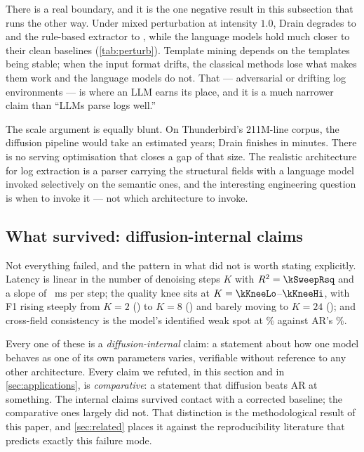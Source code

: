 There is a real boundary, and it is the one negative result in this subsection
that runs the other way. Under mixed perturbation at intensity $1.0$, Drain
degrades to \drainPerturbed{} and the rule-based extractor to ,
while the language models hold much closer to their clean baselines
(\cref{tab:perturb}). Template mining depends on the templates being stable;
when the input format drifts, the classical methods lose what makes them work
and the language models do not. That --- adversarial or drifting log
environments --- is where an LLM earns its place, and it is a much narrower
claim than ``LLMs parse logs well.''

The scale argument is equally blunt. On Thunderbird's 211M-line corpus, the
diffusion pipeline would take an estimated \thunderbirdDM{} years; Drain
finishes in \thunderbirdDrain{} minutes. There is no serving optimisation that
closes a gap of that size. The realistic architecture for log extraction is a
parser carrying the structural fields with a language model invoked selectively
on the semantic ones, and the interesting engineering question is when to
invoke it --- not which architecture to invoke.

\subsection{What survived: diffusion-internal claims}
\label{sec:neg-survived}

Not everything failed, and the pattern in what did not is worth stating
explicitly. Latency is linear in the number of denoising steps $K$ with
$R^2 = \kSweepRsq$ and a slope of \kSweepSlope~ms per step; the quality knee
sits at $K = \kKneeLo$--$\kKneeHi$, with F1 rising steeply from $K=2$
() to $K=8$ () and barely
moving to $K=24$ (); and cross-field consistency
is the model's identified weak spot at \mdmConsistency\% against AR's
\arConsistency\%.

Every one of these is a \emph{diffusion-internal} claim: a statement about how
one model behaves as one of its own parameters varies, verifiable without
reference to any other architecture. Every claim we refuted, in this section and
in \cref{sec:applications}, is \emph{comparative}: a statement that diffusion
beats AR at something. The internal claims survived contact with a corrected
baseline; the comparative ones largely did not. That distinction is the
methodological result of this paper, and \cref{sec:related} places it against
the reproducibility literature that predicts exactly this failure mode.
